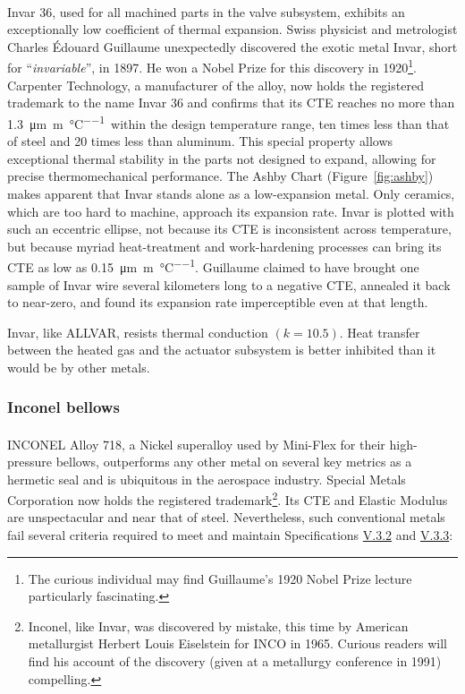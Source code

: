\documentclass[12pt, letterpaper]{report}%
\newcounter{mycounter}           %
\newcounter{sub}[mycounter]      %
\newcommand{\specInvarCTE}{\SI{1.3}{\micro\meter\per\meter\per\celsius}}
\newcommand{\specref}[1]{\hyperref[tab:specs]{#1}}
\begin{document}
				Invar 36\textsuperscript{{\textregistered{}}}\cite{ref_Carpenter_Inv}, used for all machined parts in the valve subsystem, exhibits an exceptionally low coefficient of thermal expansion.
				Swiss physicist and metrologist Charles \'{E}douard Guillaume unexpectedly discovered the exotic metal Invar, short for ``\textit{invariable}'', in 1897\cite{ref_Invar_1897}.
				He won a Nobel Prize for this discovery in 1920\footnote{
					The curious individual may find Guillaume's 1920 Nobel Prize lecture\cite{ref_Invar_1920} particularly fascinating.
				}\cite{ref_Invar_1920}.
				Carpenter Technology\cite{ref_Carpenter_gen}, a manufacturer of the alloy, now holds the registered trademark to the name Invar 36 and confirms that its CTE reaches no more than \specInvarCTE\ within the design temperature range\cite{ref_Carpenter_Inv},
				ten times less than that of steel\cite{ref_ASM_Steel} and 20 times less than aluminum\cite{ref_NASA_specs_Al}.
				This special property allows exceptional thermal stability in the parts not designed to expand, allowing for precise thermomechanical performance.
				The Ashby Chart (Figure~\ref{fig:ashby}) makes apparent that Invar stands alone as a low-expansion metal. Only ceramics, which are too hard to machine, approach its expansion rate.
				Invar is plotted with such an eccentric ellipse, not because its CTE is inconsistent across temperature, but because myriad heat-treatment and work-hardening processes can bring its CTE as low as \SI{0.15}{\micro\meter\per\meter\per\celsius}.
				Guillaume claimed to have brought one sample of Invar wire several kilometers long to a negative CTE, annealed it back to near-zero, and found its expansion rate imperceptible even at that length\cite[p.~452]{ref_Invar_1920}.

				Invar, like ALLVAR, resists thermal conduction $(k = 10.5)$. Heat transfer between the heated gas and the actuator subsystem is better inhibited than it would be by other metals.

			\subsubsection{Inconel bellows}
			\label{subsubsec:design:just:mat:Inc}

				INCONEL\textsuperscript{{\textregistered{}}}\cite{ref_SpecialMetals_Inc} Alloy 718, a Nickel superalloy used by Mini-Flex for their high-pressure bellows, outperforms any other metal on several key metrics as a hermetic seal and is ubiquitous in the aerospace industry\cite[p.~1]{ref_SpecialMetals_Inc}.
				Special Metals Corporation\cite{ref_SpecialMetals_gen} now holds the registered trademark\footnote{
					Inconel, like Invar, was discovered by mistake, this time by American metallurgist Herbert Louis Eiselstein for INCO in 1965\cite{ref_Inconel_1965}.
					Curious readers will find his account of the discovery (given at a metallurgy conference in 1991) compelling\cite{ref_Inconel_1991}.}.
				Its CTE and Elastic Modulus are unspectacular and near that of steel.
				Nevertheless, such conventional metals fail several criteria required to meet and maintain Specifications \specref{V.3.2} and \specref{V.3.3}:
\end{document}
